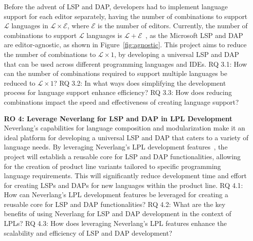 \hfill \break
Before the advent of LSP and DAP, developers had to implement language support for each editor separately, having the number of combinations to support $\mathcal{L}$ languages in $\mathcal{L} \times \mathcal{E}$, where $\mathcal{E}$ is the number of editors.
Currently, the number of combinations to support $\mathcal{L}$ languages is $\mathcal{L} + \mathcal{E}$~\cite{Rodriguez-Echeverria18a}, as the Microsoft LSP and DAP are editor-agnostic, as shown in Figure~\ref{fig:agnostic}. This project aims to reduce the number of combinations to $\mathcal{L} \times 1$, by developing a universal LSP and DAP that can be used across different programming languages and IDEs.
\hfill \break
\textsf{RQ 3.1}: How can the number of combinations required to support multiple languages be reduced to $\mathcal{L} \times 1$?
\hfill \break
\textsf{RQ 3.2}: In what ways does simplifying the development process for language support enhance efficiency?
\hfill \break
\textsf{RQ 3.3}: How does reducing combinations impact the speed and effectiveness of creating language support?


\hfill \break
\noindent
\textbf{RO 4: Leverage Neverlang for LSP and DAP in LPL Development}
\hfill \break
Neverlang's capabilities for language composition and modularization make it an ideal platform for developing a universal LSP and DAP that caters to a variety of language needs. By leveraging Neverlang's LPL development features~\cite{Cazzola20}, the project will establish a reusable core for LSP and DAP functionalities, allowing for the creation of product line variants tailored to specific programming language requirements. This will significantly reduce development time and effort for creating LSPs and DAPs for new languages within the product line.
\hfill \break
\textsf{RQ 4.1}: How can Neverlang's LPL development features be leveraged for creating a reusable core for LSP and DAP functionalities?
\hfill \break
\textsf{RQ 4.2}: What are the key benefits of using Neverlang for LSP and DAP development in the context of LPLs?
\hfill \break
\textsf{RQ 4.3}: How does leveraging Neverlang's LPL features enhance the scalability and efficiency of LSP and DAP development?
